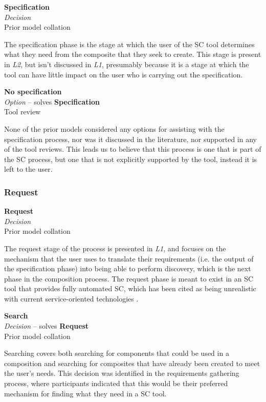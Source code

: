 \textbf{Specification} \\ \emph{Decision} \\ Prior model collation \cite{Mehandjiev2012}

The specification phase is the stage at which the user of the SC tool determines what they need from the composite that they seek to create. This stage is present in \emph{L2}, but isn't discussed in \emph{L1}, presumably because it is a stage at which the tool can have little impact on the user who is carrying out the specification.

\textbf{No specification} \\ \emph{Option} -- solves \textbf{Specification} \\ Tool review

None of the prior models considered any options for assisting with the specification process, nor was it discussed in the literature, nor supported in any of the tool reviews. This leads us to believe that this process is one that is part of the SC process, but one that is not explicitly supported by the tool, instead it is left to the user.

\subsubsection{Request}

\textbf{Request} \\ \emph{Decision} \\ Prior model collation \cite{Mehandjiev2012}

The request stage of the process is presented in \emph{L1}, and focuses on the mechanism that the user uses to translate their requirements (i.e. the output of the specification phase) into being able to perform discovery, which is the next phase in the composition process. The request phase is meant to exist in an SC tool that provides fully automated SC, which has been cited as being unrealistic with current service-oriented technologies \cite{Vulcu2008}.

\textbf{Search} \\ \emph{Decision} -- solves \textbf{Request} \\ Prior model collation \cite{Grammel2010}

Searching covers both searching for components that could be used in a composition and searching for composites that have already been created to meet the user's needs. This decision was identified in the requirements gathering process, where participants indicated that this would be their preferred mechanism for finding what they need in a SC tool.

